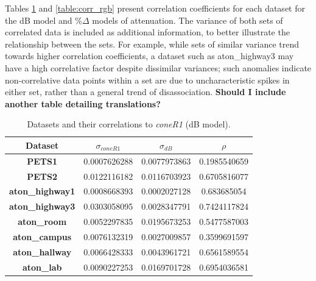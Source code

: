 \documentclass[12pt]{report}
\begin{document}
Tables \ref{table:corr_db} and \ref{table:corr_rgb} present correlation coefficients for each dataset for the dB model and \%$\Delta$ models of attenuation. The variance of both sets of correlated data is included as additional information, to better illustrate the relationship between the sets. For example, while sets of similar variance trend towards higher correlation coefficients, a dataset such as aton\_highway3 may have a high correlative factor despite dissimilar variances; such anomalies indicate non-correlative data points within a set are due to uncharacteristic spikes in either set, rather than a general trend of disassociation. \textbf{Should I include another table detailing translations?}

\begin{table}
\begin{tabular}{ |c|c|c|c| }
	\hline
	\textbf{Dataset} & \textbf{$\sigma_{coneR1}$} & \textbf{$\sigma_{dB}$} & \textbf{$\rho$} \\
	\hline
	\hline
	\textbf{PETS1} & 0.0007626288 & 0.0077973863 & 0.1985540659 \\
	\hline
	\textbf{PETS2} & 0.0122116182 & 0.0116703923 & 0.6705816077 \\
	\hline
	\textbf{aton\_highway1} & 0.0008668393 & 0.0002027128 & 0.683685054 \\
	\hline
	\textbf{aton\_highway3} & 0.0303058095 & 0.0028347791 & 0.7424117824 \\
	\hline
	\textbf{aton\_room} & 0.0052297835 & 0.0195673253 &  0.5477587003 \\
	\hline
	\textbf{aton\_campus} & 0.0076132319 & 0.0027009857 &  0.3599691597 \\
	\hline
	\textbf{aton\_hallway} & 0.0066428333 & 0.0043961721 &  0.6561589554 \\
	\hline
	\textbf{aton\_lab} & 0.0090227253 & 0.0169701728 &  0.6954036581 \\
	\hline
\end{tabular}
\caption{Datasets and their correlations to \textit{coneR1} (dB model).}
\label{table:corr_db}
\end{table}
\end{document}
